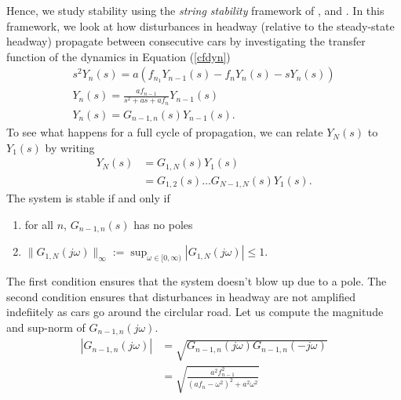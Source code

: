\documentclass[10pt,twocolumn]{article}
\theoremstyle{ss}
\begin{document}
Hence, we study stability using the {\em string stability} framework of \cite{Liang00,Liang99}, \cite{Konishi} and \cite{Yanakiev}. In this framework, we look at how disturbances in headway (relative to the steady-state headway) propagate between consecutive cars by investigating the transfer function of the dynamics in Equation (\ref{cfdyn})
\begin{gather}
s^2 Y_n(s) = a(f_{n_1}Y_{n-1}(s) - f_nY_n(s) - sY_n(s))\\
Y_n(s) = \frac{af_{n-1}}{s^2 + as + af_n}Y_{n-1}(s)\\
Y_n(s) = G_{n-1,n}(s)Y_{n-1}(s).
\end{gather}
To see what happens for a full cycle of propagation, we can relate $Y_N(s)$ to $Y_1(s)$ by writing
\begin{align}
Y_N(s) &= G_{1,N}(s) Y_1(s)\\
&= G_{1,2}(s) \dots G_{N-1,N}(s) Y_1(s).
\end{align}
The system is stable if and only if
\begin{enumerate}
\item for all $n$, $G_{n-1,n}(s)$ has no poles
\item $\|G_{1,N}(j\omega)\|_{\infty} := \displaystyle \sup_{\omega \in [0,\infty)} |G_{1,N}(j\omega)| \leq 1$.
\end{enumerate}
The first condition ensures that the system doesn't blow up due to a pole. The second condition ensures that disturbances in headway are not amplified indefiitely as cars go around the circlular road.
Let us compute the magnitude and sup-norm of $G_{n-1,n}(j\omega)$.
\begin{align}
|G_{n-1,n}(j\omega)| &= \sqrt{G_{n-1,n}(j\omega)G_{n-1,n}(-j\omega)}\\
&= \sqrt{\frac{a^2f_{n-1}^2}{(af_n - \omega^2)^2 + a^2\omega^2}}
\end{align}
\end{document}
